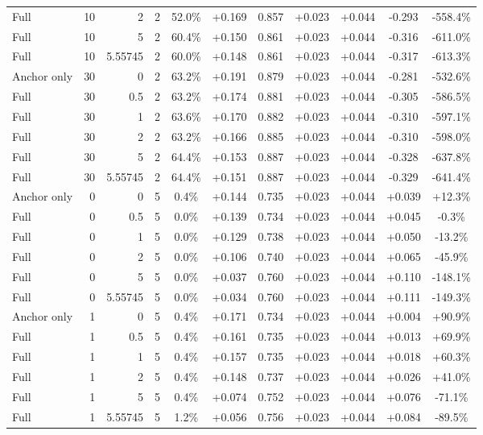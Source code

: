 \begin{table}[htbp]
\begin{tabular}{lrrrccccccc}
Full & 10 & 2 & 2 & 52.0\% & +0.169 & 0.857 & +0.023 & +0.044 & -0.293 & -558.4\% \\
Full & 10 & 5 & 2 & 60.4\% & +0.150 & 0.861 & +0.023 & +0.044 & -0.316 & -611.0\% \\
Full & 10 & 5.55745 & 2 & 60.0\% & +0.148 & 0.861 & +0.023 & +0.044 & -0.317 & -613.3\% \\
Anchor only & 30 & 0 & 2 & 63.2\% & +0.191 & 0.879 & +0.023 & +0.044 & -0.281 & -532.6\% \\
Full & 30 & 0.5 & 2 & 63.2\% & +0.174 & 0.881 & +0.023 & +0.044 & -0.305 & -586.5\% \\
Full & 30 & 1 & 2 & 63.6\% & +0.170 & 0.882 & +0.023 & +0.044 & -0.310 & -597.1\% \\
Full & 30 & 2 & 2 & 63.2\% & +0.166 & 0.885 & +0.023 & +0.044 & -0.310 & -598.0\% \\
Full & 30 & 5 & 2 & 64.4\% & +0.153 & 0.887 & +0.023 & +0.044 & -0.328 & -637.8\% \\
Full & 30 & 5.55745 & 2 & 64.4\% & +0.151 & 0.887 & +0.023 & +0.044 & -0.329 & -641.4\% \\
Anchor only & 0 & 0 & 5 & 0.4\% & +0.144 & 0.735 & +0.023 & +0.044 & +0.039 & +12.3\% \\
Full & 0 & 0.5 & 5 & 0.0\% & +0.139 & 0.734 & +0.023 & +0.044 & +0.045 & -0.3\% \\
Full & 0 & 1 & 5 & 0.0\% & +0.129 & 0.738 & +0.023 & +0.044 & +0.050 & -13.2\% \\
Full & 0 & 2 & 5 & 0.0\% & +0.106 & 0.740 & +0.023 & +0.044 & +0.065 & -45.9\% \\
Full & 0 & 5 & 5 & 0.0\% & +0.037 & 0.760 & +0.023 & +0.044 & +0.110 & -148.1\% \\
Full & 0 & 5.55745 & 5 & 0.0\% & +0.034 & 0.760 & +0.023 & +0.044 & +0.111 & -149.3\% \\
Anchor only & 1 & 0 & 5 & 0.4\% & +0.171 & 0.734 & +0.023 & +0.044 & +0.004 & +90.9\% \\
Full & 1 & 0.5 & 5 & 0.4\% & +0.161 & 0.735 & +0.023 & +0.044 & +0.013 & +69.9\% \\
Full & 1 & 1 & 5 & 0.4\% & +0.157 & 0.735 & +0.023 & +0.044 & +0.018 & +60.3\% \\
Full & 1 & 2 & 5 & 0.4\% & +0.148 & 0.737 & +0.023 & +0.044 & +0.026 & +41.0\% \\
Full & 1 & 5 & 5 & 0.4\% & +0.074 & 0.752 & +0.023 & +0.044 & +0.076 & -71.1\% \\
Full & 1 & 5.55745 & 5 & 1.2\% & +0.056 & 0.756 & +0.023 & +0.044 & +0.084 & -89.5\% \\

\end{tabular}
\end{table}

